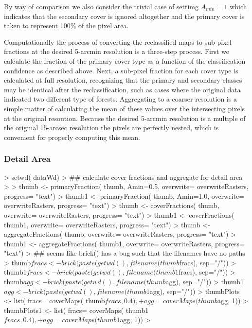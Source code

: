 By way of comparison we also consider the trivial case of settimg
$A_{min} = 1$ which indicates that the secondary cover is ignored
altogether and the primary cover is taken to represent 100\% of the
pixel area.

Computationally the process of converting the reclassified maps to
sub-pixel fractions at the desired 5-arcmin resolution is a three-step
process.  First we calculate the fraction of the primary cover type as
a function of the classification confidence as described above.  Next,
a sub-pixel fraction for each cover type is calculated at full
resolution, recognizing that the primary and secondary classes may be
identical after the reclassification, such as cases where the original
data indicated two different type of forests.  Aggregating to a
coarser resolution is a simple matter of calculating the mean of these
values over the intersecting pixels at the original resoution.
Because the desired 5-arcmin resolution is a multiple of the original
15-arcsec resolution the pixels are perfectly nested, which is
convenient for properly computing this mean.

\subsubsection{Detail Area}
\label{sec:agg-detail-area}

\begin{Schunk}
\begin{Sinput}
> setwd( dataWd)
> ## calculate cover fractions and aggregate for detail area
> 
> thumb  <- primaryFraction( thumb, Amin=0.5, overwrite= overwriteRasters, progress= "text")
> thumb1 <- primaryFraction( thumb, Amin=1.0, overwrite= overwriteRasters, progress= "text")
> thumb  <- coverFractions( thumb, overwrite= overwriteRasters, progress= "text")
> thumb1 <- coverFractions( thumb1, overwrite= overwriteRasters, progress= "text")
> thumb  <- aggregateFractions( thumb, overwrite= overwriteRasters, progress= "text")
> thumb1 <- aggregateFractions( thumb1, overwrite= overwriteRasters, progress= "text")
> ## seems like brick() has a bug such that the filenames have no paths
> thumb$fracs <- brick( paste( getwd(), filename( thumb$fracs), sep="/"))
> thumb1$fracs <- brick( paste( getwd(), filename( thumb1$fracs), sep="/"))
> thumb$agg <- brick( paste( getwd(), filename( thumb$agg), sep="/"))
> thumb1$agg <- brick( paste( getwd(), filename( thumb1$agg), sep="/"))
> thumbPlots <- list( fracs= coverMaps( thumb$fracs, 0.4),
+                    agg= coverMaps( thumb$agg, 1))
> thumbPlots1 <- list( fracs= coverMaps( thumb1$fracs, 0.4),
+                    agg= coverMaps( thumb1$agg, 1))
> 
\end{Sinput}
\end{Schunk}

